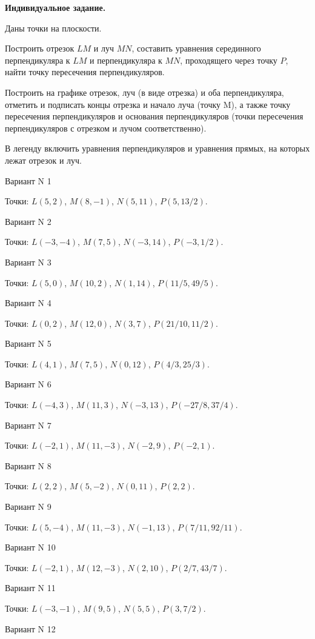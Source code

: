 \documentclass[11pt]{report}
\begin{document}
\pagestyle{empty}

{\bf Индивидуальное задание.}


Даны точки на плоскости. 

Построить отрезок $LM$ и луч $MN$, составить уравнения серединного перпендикуляра  к $LM$ и перпендикуляра к $MN$, проходящего через точку $P$, найти точку пересечения перпендикуляров.

Построить на графике отрезок, луч (в виде отрезка) и оба перпендикуляра, отметить и подписать концы отрезка и начало луча (точку M), а также точку пересечения перпендикуляров и основания перпендикуляров (точки пересечения перпендикуляров с отрезком и лучом соответственно).

В легенду включить уравнения перпендикуляров и уравнения прямых, на которых лежат отрезок и
 луч.

Вариант N 1

Точки: $L(5, 2)$, $M(8, -1)$, $N(5, 11)$, $P(5, 13/2)$.

Вариант N 2

Точки: $L(-3, -4)$, $M(7, 5)$, $N(-3, 14)$, $P(-3, 1/2)$.

Вариант N 3

Точки: $L(5, 0)$, $M(10, 2)$, $N(1, 14)$, $P(11/5, 49/5)$.

Вариант N 4

Точки: $L(0, 2)$, $M(12, 0)$, $N(3, 7)$, $P(21/10, 11/2)$.

Вариант N 5

Точки: $L(4, 1)$, $M(7, 5)$, $N(0, 12)$, $P(4/3, 25/3)$.

Вариант N 6

Точки: $L(-4, 3)$, $M(11, 3)$, $N(-3, 13)$, $P(-27/8, 37/4)$.

Вариант N 7

Точки: $L(-2, 1)$, $M(11, -3)$, $N(-2, 9)$, $P(-2, 1)$.

Вариант N 8

Точки: $L(2, 2)$, $M(5, -2)$, $N(0, 11)$, $P(2, 2)$.

Вариант N 9

Точки: $L(5, -4)$, $M(11, -3)$, $N(-1, 13)$, $P(7/11, 92/11)$.

Вариант N 10

Точки: $L(-2, 1)$, $M(12, -3)$, $N(2, 10)$, $P(2/7, 43/7)$.

Вариант N 11

Точки: $L(-3, -1)$, $M(9, 5)$, $N(5, 5)$, $P(3, 7/2)$.

Вариант N 12
\end{document}
